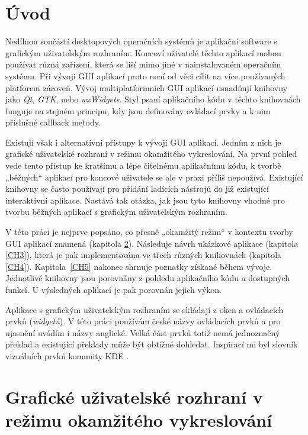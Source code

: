\documentclass[FM,DP]{tulthesis}
\begin{document}
	\chapter{Úvod}
	
	Nedílnou součástí desktopových operačních systémů je aplikační software s grafickým uživatelským rozhraním. Koncoví uživatelé těchto aplikací mohou používat různá zařízení, která se liší mimo jiné v nainstalovaném operačním systému. Při vývoji GUI aplikací proto není od věci cílit na více používaných platforem zároveň. Vývoj multiplatformních GUI aplikací usnadňují knihovny jako \textit{Qt}, \textit{GTK}, nebo \textit{wxWidgets}. Styl psaní aplikačního kódu v těchto knihovnách funguje na stejném principu, kdy jsou definovány ovládací prvky a k nim příslušné callback metody.
	
	Existují však i alternativní přístupy k vývoji GUI aplikací. Jedním z nich je grafické uživatelské rozhraní v režimu okamžitého vykreslování. Na první pohled vede tento přístup ke kratšímu a lépe čitelnému aplikačnímu kódu, k tvorbě „běžných“ aplikací pro koncové uživatele se ale v praxi příliš nepoužívá. Existující knihovny se často používají pro přidání ladících nástrojů do již existující interaktivní aplikace. Nastává tak otázka, jak jsou tyto knihovny vhodné pro tvorbu běžných aplikací s grafickým uživatelským rozhraním.
	
	V této práci je nejprve popsáno, co přesně „okamžitý režim“ v kontextu tvorby GUI aplikací znamená (kapitola \ref{CH2}). Následuje návrh ukázkové aplikace (kapitola \ref{CH3}), která je pak implementována ve třech různých knihovnách (kapitola \ref{CH4}). Kapitola~\ref{CH5} nakonec shrnuje poznatky získané během vývoje. Jednotlivé knihovny jsou porovnány z pohledu aplikačního kódu a dostupných funkcí. U výsledných aplikací je pak porovnán jejich výkon.
	
	Aplikace s grafickým uživatelským rozhraním se skládají z oken a ovládacích prvků (\textit{widgetů}). V této práci používám české názvy ovládacích prvků a pro ujasnění uvádím i názvy anglické. Velká část prvků totiž nemá jednoznačný překlad a existující překlady může být obtížné dohledat. Inspirací mi byl slovník vizuálních prvků komunity KDE \cite{online_kde}.

	\chapter{Grafické uživatelské rozhraní v režimu okamžitého vykreslování}\label{CH2}
	
\end{document}

